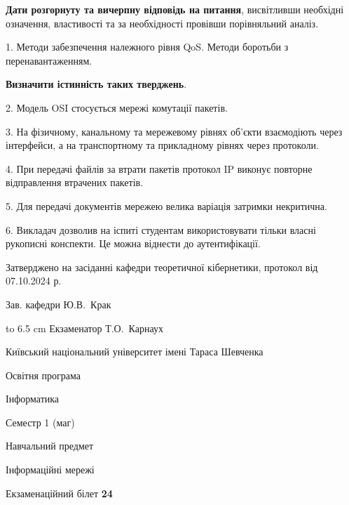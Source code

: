 \documentclass[12pt, ukrainian]{article}
\begin{document}
{
\qquad\textbf{Дати розгорнуту та вичерпну відповідь на питання}, висвітливши необхідні означення, властивості та за необхідності провівши порівняльний аналіз.

1. Методи забезпечення належного рівня QoS. Методи боротьби з перенавантаженням.



\qquad\textbf{Визначити істинність таких тверджень}.

2. Модель OSI стосується мережі комутації пакетів.


3. На фізичному, канальному та мережевому рівнях об'єкти взаємодіють через інтерфейси, а на транспортному та прикладному рівнях через протоколи.


4. При передачі файлів за втрати пакетів протокол IP виконує повторне відправлення втрачених пакетів.


5. Для передачі документів мережею велика варіація затримки некритична.


6. Викладач дозволив на іспиті студентам використовувати тільки власні рукописні конспекти. Це можна віднести до аутентифікації.

}
{\smallskip\smallskip \begin {scriptsize} Затверджено на засіданні кафедри теоретичної кібернетики, протокол   від   07.10.2024 р.\par\smallskip\smallskip\smallskip\smallskip
{\parbox {6.5 cm} {Зав. кафедри \dotfill Ю.В.~Крак}}\hspace {0.7cm} {\hbox to 6.5 cm { Екзаменатор \dotfill Т.О.~Карнаух}} \end{scriptsize}}
\vspace{0.9cm}
{{\begin {scriptsize}\par
{ \center  Київський національний університет імені Тараса Шевченка \par}
{\parbox {5 cm}{Освітня програма \hfill}{\parbox {7 cm}{Інформатика\hfill}}\parbox {6 cm}{\hfill Семестр 1 (маг)}}\par
{\parbox {5 cm} {Навчальний предмет \hfill}\parbox {7 cm}{Інформаційні мережі \hfill}\parbox {6cm}{\hfill}\par}\vspace{-15pt} \end{scriptsize}}{\center Екзаменаційний білет \No \textbf { 24 }\par}}
\end{document}
